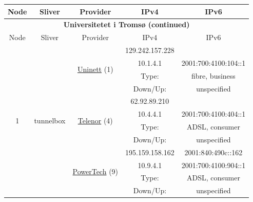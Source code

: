 \begin{small}
\begin{center}
\begin{longtable}{|c|c|c|c|c|c|c|c|}
 \multicolumn{2}{|p{8em}|}{Node} & \multicolumn{2}{|p{8em}|}{Sliver} & \multicolumn{2}{|p{8em}|}{Provider} & IPv4 & IPv6 \\ \hline
\endfirsthead
\hline
 \multicolumn{8}{|c|}{\textbf{Universitetet i Tromsø (continued)}} \\ \hline
 \multicolumn{2}{|p{8em}|}{Node} & \multicolumn{2}{|p{8em}|}{Sliver} & \multicolumn{2}{|p{8em}|}{Provider} & IPv4 & IPv6 \\ \hline
\endhead
 \multirow{12}{*}{\tiny{1}} & \multicolumn{3}{|c|}{\multirow{12}{*}{\tiny{tunnelbox}}} & \multicolumn{2}{|c|}{\multirow{4}{*}{\tiny{\href{https://www.uninett.no}{Uninett} (1)}}} & \tiny{129.242.157.228} & \frownie{} \\* \cline{7-7}\cline{8-8}
  & \multicolumn{3}{|c|}{} & \multicolumn{2}{|c|}{} & \tiny{10.1.4.1} & \tiny{2001:700:4100:104::1} \\* \cline{7-7}\cline{8-8}
  & \multicolumn{3}{|c|}{} & \multicolumn{2}{|c|}{} & Type: & fibre, business \\* \cline{7-7}\cline{8-8}
  & \multicolumn{3}{|c|}{} & \multicolumn{2}{|c|}{} & Down/Up:  & unspecified \\* \cline{5-5}\cline{6-6}\cline{7-7}\cline{8-8}
  & \multicolumn{3}{|c|}{} & \multicolumn{2}{|c|}{\multirow{4}{*}{\tiny{\href{https://www.telenor.no}{Telenor} (4)}}} & \tiny{62.92.89.210} & \frownie{} \\* \cline{7-7}\cline{8-8}
  & \multicolumn{3}{|c|}{} & \multicolumn{2}{|c|}{} & \tiny{10.4.4.1} & \tiny{2001:700:4100:404::1} \\* \cline{7-7}\cline{8-8}
  & \multicolumn{3}{|c|}{} & \multicolumn{2}{|c|}{} & Type: & ADSL, consumer \\* \cline{7-7}\cline{8-8}
  & \multicolumn{3}{|c|}{} & \multicolumn{2}{|c|}{} & Down/Up:  & unspecified \\* \cline{5-5}\cline{6-6}\cline{7-7}\cline{8-8}
  & \multicolumn{3}{|c|}{} & \multicolumn{2}{|c|}{\multirow{4}{*}{\tiny{\href{http://www.powertech.no}{PowerTech} (9)}}} & \tiny{195.159.158.162} & \tiny{2001:840:490c::162} \\* \cline{7-7}\cline{8-8}
  & \multicolumn{3}{|c|}{} & \multicolumn{2}{|c|}{} & \tiny{10.9.4.1} & \tiny{2001:700:4100:904::1} \\* \cline{7-7}\cline{8-8}
  & \multicolumn{3}{|c|}{} & \multicolumn{2}{|c|}{} & Type: & ADSL, consumer \\* \cline{7-7}\cline{8-8}
  & \multicolumn{3}{|c|}{} & \multicolumn{2}{|c|}{} & Down/Up:  & unspecified \\ \hline

\end{longtable}
\end{center}
\end{small}
